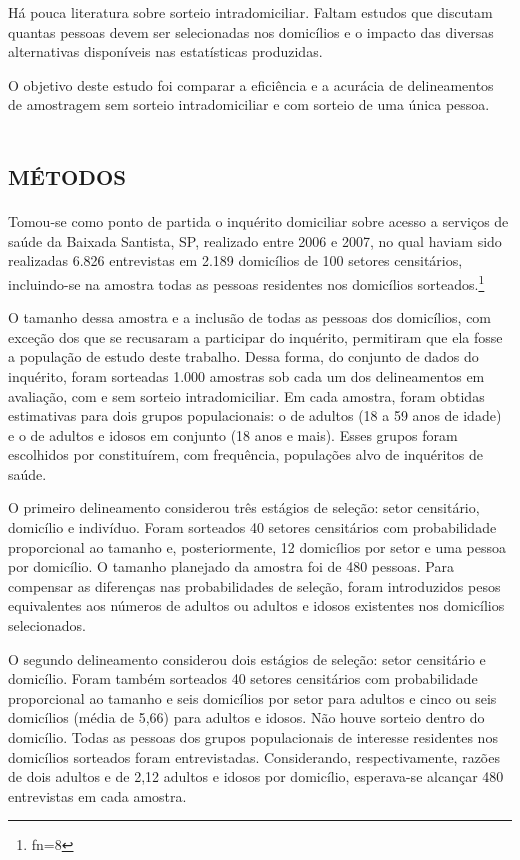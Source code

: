 \documentclass{article}
\makeatletter
\newcommand{\fn}{\afterassignment\fn@aux\count0=}
\newcommand{\fn@aux}{\csname fn\the\count0\endcsname}
\makeatother
\begin{document}
Há pouca literatura sobre sorteio intradomiciliar. Faltam estudos que discutam
quantas pessoas devem ser selecionadas nos domicílios e o impacto das diversas
alternativas disponíveis nas estatísticas produzidas.

O objetivo deste estudo foi comparar a eficiência e a acurácia de delineamentos
de amostragem sem sorteio intradomiciliar e com sorteio de uma única pessoa.

\section{\textsc{métodos}}

Tomou-se como ponto de partida o inquérito domiciliar sobre acesso a serviços de
saúde da Baixada Santista, SP, realizado entre 2006 e 2007, no qual haviam sido
realizadas 6.826 entrevistas em 2.189 domicílios de 100 setores censitários,
incluindo-se na amostra todas as pessoas residentes nos domicílios
sorteados.\footnote{\fn8}

O tamanho dessa amostra e a inclusão de todas as pessoas dos domicílios, com
exceção dos que se recusaram a participar do inquérito, permitiram que ela fosse
a população de estudo deste trabalho. Dessa forma, do conjunto de dados do
inquérito, foram sorteadas 1.000 amostras sob cada um dos delineamentos em
avaliação, com e sem sorteio intradomiciliar. Em cada amostra, foram obtidas
estimativas para dois grupos populacionais: o de adultos (18 a 59 anos de idade)
e o de adultos e idosos em conjunto (18 anos e mais). Esses grupos foram
escolhidos por constituírem, com frequência, populações alvo de inquéritos de
saúde.

O primeiro delineamento considerou três estágios de seleção: setor censitário,
domicílio e indivíduo. Foram sorteados 40 setores censitários com probabilidade
proporcional ao tamanho e, posteriormente, 12 domicílios por setor e uma pessoa
por domicílio. O tamanho planejado da amostra foi de 480 pessoas. Para compensar
as diferenças nas probabilidades de seleção, foram introduzidos pesos
equivalentes aos números de adultos ou adultos e idosos existentes nos
domicílios selecionados.

O segundo delineamento considerou dois estágios de seleção: setor censitário e
domicílio. Foram também sorteados 40 setores censitários com probabilidade
proporcional ao tamanho e seis domicílios por setor para adultos e cinco ou seis
domicílios (média de 5,66) para adultos e idosos. Não houve sorteio dentro do
domicílio. Todas as pessoas dos grupos populacionais de interesse residentes nos
domicílios sorteados foram entrevistadas. Considerando, respectivamente, razões
de dois adultos e de 2,12 adultos e idosos por domicílio, esperava-se alcançar
480 entrevistas em cada amostra.
\end{document}

